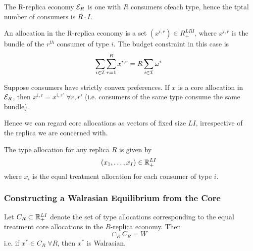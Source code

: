 \begin{definition}
  The R-replica economy ${\cal E}_R$ is one with $R$ consumers ofeach
  type, hence the tptal number of consumers is $R \cdot I$.
\end{definition}

\begin{definition}[Allocation]
  An allocation in the R-replica economy is a set $(x^{i,r}) \in
  R^{LRI}_+$, where $x^{i,r}$ is the bundle of the $r^{th}$ consumer
  of type $i$. The budget constraint in this case is
  \[
  \sum_{i \in {\cal I}} \sum_{r=1}^R x^{i,r} = R \sum_{i \in {\cal I}} \omega^i
  \]
\end{definition}


\begin{prop}
  Suppose consumers have strictly convex preferences. If $x$ is a core
  allocation in ${\cal E}_R$, then $x^{i,r} = x^{i,r'} \; \forall r,
  r'$ (i.e. consumers of the same type consume the same bundle).
\end{prop}

Hence we can regard core allocations as vectors of fixed size $LI$,
irrespective of the replica we are concerned with.

\begin{definition}
  The type allocation for any replica $R$ is given by
  \[
  (x_1, \dots, x_{I}) \in {\mathbb R}^{LI}_+
  \]
  where $x_i$ is the equal treatment allocation for each consumer of
  type $i$.
\end{definition}

\subsubsection{Constructing a Walrasian Equilibrium from the Core}
\label{sec:constr-walr-equil}

\begin{theorem}
  Let $C_R \subset {\mathbb R}^{LI}_+$ denote the set of type allocations
  corresponding to the equal treatment core allocations in the
  $R$-replica economy. Then
  \[
  \cap_R C_R = W
  \]
  i.e. if $x^* \in C_R \; \forall R$, then $x^*$ is Walrasian.
\end{theorem}

